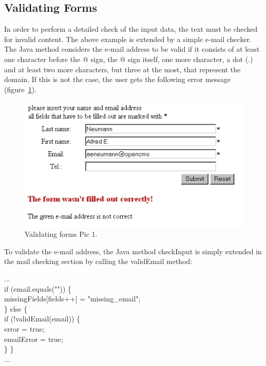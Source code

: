 \subsection{Validating Forms}
In order to perform a detailed check of the input data, the text must be
checked for invalid content. The above example is extended by a simple
e-mail checker. The Java method considers the e-mail address to be
valid  if it consists of at least one character before the @ sign, the @
sign itself, one more character, a dot (.) and at least two more
characters, but three at the most, that represent the domain. If this is
not the case, the user gets the following error message
(figure~\ref{ValidaForms}).

\begin{figure}
\begin{center}
\includegraphics[clip,width=0.7\linewidth]{pics/modules/43}
\end{center}
\caption[Validating forms Pic 1]{Validating forms Pic 1.}
\label{ValidaForms}
\end{figure}

To validate the e-mail address, the Java method {\meth checkInput} is simply
extended in the mail checking section by calling the {\meth validEmail} method:

\begin{java}
...\\
if (email.equals("")) \{\\
\jtabc        missingFields[fields++] = "missing\_email";\\
\jtabc       \} else \{\\
\jtabc        if (!validEmail(email)) \{\\
\jtabe                error = true;\\
\jtabe                emailError = true;\\
\jtabc        \}
\}\\
...\\
\end{java}


